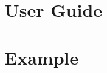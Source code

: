 \documentclass{book}
\begin{document}
\frontmatter
\maketitle
\tableofcontents

\mainmatter
\part{User Guide}



\part{Example}

\end{document}

